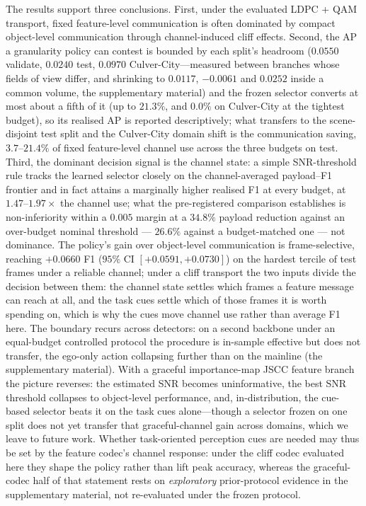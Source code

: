 \documentclass[journal]{IEEEtran}
\begin{document}
The results support three conclusions. First, under the evaluated LDPC + QAM transport, fixed feature-level communication is often dominated by compact object-level communication through channel-induced cliff effects. Second, the AP a granularity policy can contest is bounded by each split's headroom ($0.0550$ validate, $0.0240$ test, $0.0970$ Culver-City---measured between branches whose fields of view differ, and shrinking to $0.0117$, $-0.0061$ and $0.0252$ inside a common volume, the supplementary material) and the frozen selector converts at most about a fifth of it (up to $21.3\%$, and $0.0\%$ on Culver-City at the tightest budget), so its realised AP is reported descriptively; what transfers to the scene-disjoint test split and the Culver-City domain shift is the communication saving, $3.7$--$21.4\%$ of fixed feature-level channel use across the three budgets on test. Third, the dominant decision signal is the channel state: a simple SNR-threshold rule tracks the learned selector closely on the channel-averaged payload--F1 frontier and in fact attains a marginally higher realised F1 at every budget, at $1.47$--$1.97\times$ the channel use; what the pre-registered comparison establishes is non-inferiority within a $0.005$ margin at a $34.8\%$ payload reduction against an over-budget nominal threshold --- $26.6\%$ against a budget-matched one --- not dominance. The policy's gain over object-level communication is frame-selective, reaching $+0.0660$ F1 ($95\%$ CI $[+0.0591,+0.0730]$) on the hardest tercile of test frames under a reliable channel; under a cliff transport the two inputs divide the decision between them: the channel state settles which frames a feature message can reach at all, and the task cues settle which of those frames it is worth spending on, which is why the cues move channel use rather than average F1 here. The boundary recurs across detectors: on a second backbone under an equal-budget controlled protocol the procedure is in-sample effective but does not transfer, the ego-only action collapsing further than on the mainline (the supplementary material). With a graceful importance-map JSCC feature branch the picture reverses: the estimated SNR becomes uninformative, the best SNR threshold collapses to object-level performance, and, in-distribution, the cue-based selector beats it on the task cues alone---though a selector frozen on one split does not yet transfer that graceful-channel gain across domains, which we leave to future work. Whether task-oriented perception cues are needed may thus be set by the feature codec's channel response: under the cliff codec evaluated here they shape the policy rather than lift peak accuracy, whereas the graceful-codec half of that statement rests on \emph{exploratory} prior-protocol evidence in the supplementary material, not re-evaluated under the frozen protocol.






\end{document}
